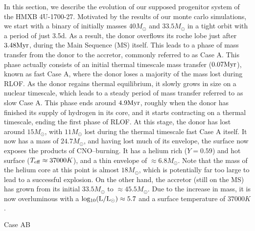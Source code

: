 \documentclass[linenumbers,trackchanges,twocolumn]{aastex701}
\begin{document}
In this section, we describe the evolution of our supposed progenitor system of the HMXB 4U-1700-27. Motivated by the results of our monte carlo simulations, we start with a binary of initially masses $40M_{\odot}$ and $33.5M_{\odot}$ in a tight orbit with a period of just 3.5d. As a result, the donor overflows its roche lobe just after $3.48 \rm Myr$, during the Main Sequence (MS) itself. This leads to a phase of mass transfer from the donor to the accretor, commonly referred to as Case A. This phase actually consists of an initial thermal timescale mass transfer ($0.07\rm Myr$), known as fast Case A, where the donor loses a majority of the mass lost during RLOF. As the donor regains thermal equilibrium, it slowly grows in size on a nuclear timescale, which leads to a steady period of mass transfer referred to as slow Case A. This phase ends around $4.9\rm Myr$, roughly when the donor has finished its supply of hydrogen in its core, and it starts contracting on a thermal timescale, ending the first phase of RLOF. At this stage, the donor has lost around $15M_{\odot}$, with $11M_{\odot}$ lost during the thermal timescale fast Case A itself. It now has a mass of $24.7M_{\odot}$, and having lost much of its envelope, the surface now exposes the products of CNO--burning. It has a helium rich ($Y = 0.59$) and hot surface ($T_{\rm eff} \approx 37000K$), and a thin envelope of $\approx 6.8M_{\odot}$. Note that the mass of the helium core at this point is almost $18M_{\odot}$, which is potentially far too large to lead to a successful explosion. On the other hand, the accretor (still on the MS) has grown from its initial $33.5M_{\odot}$ to $\approx 45.5M_{\odot}$. Due to the increase in mass, it is now overluminous with a $\rm log_{10} (L/L_{\odot}) \approx 5.7$ and a surface temperature of $37000K$.

Case AB 
\end{document}
